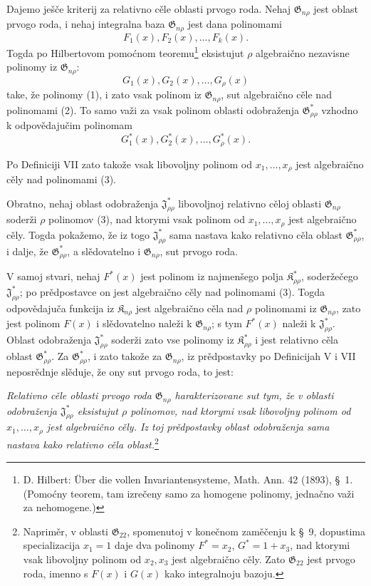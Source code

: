 \documentclass[11pt]{article}
\providecommand{\Kfield}{\mathfrak{K}}
\providecommand{\Jdom}{\mathfrak{J}}
\providecommand{\Gdom}{\mathfrak{G}}
\begin{document}
Dajemo ješče kriterij za relativno cěle oblasti prvogo roda. Nehaj $\Gdom_{n\rho}$ jest oblast prvogo roda, i nehaj integralna baza $\Gdom_{n\rho}$ jest dana polinomami
\begin{equation}
  F_1(x),F_2(x),\ldots,F_k(x).
\tag{1}
\end{equation}
Togda po Hilbertovom pomoćnom teoremu\footnote{D. Hilbert: Über die vollen Invariantensysteme, Math. Ann. 42 (1893), \S\ 1. (Pomoćny teorem, tam izrečeny samo za homogene polinomy, jednačno važi za nehomogene.)} eksistujut $\rho$ algebraično nezavisne polinomy iz $\Gdom_{n\rho}$:
\begin{equation}
  G_1(x),G_2(x),\ldots,G_\rho(x)
\tag{2}
\end{equation}
take, že polinomy (1), i zato vsak polinom iz $\Gdom_{n\rho}$, sut algebraično cěle nad polinomami (2). To samo važi za vsak polinom oblasti odobraženja $\Gdom^*_{\rho\rho}$ vzhodno k odpovědajučim polinomam
\begin{equation}
  G_1^*(x),G_2^*(x),\ldots,G_\rho^*(x).
\tag{3}
\end{equation}

Po Definiciji VII zato takože vsak libovoljny polinom od $x_1,\ldots,x_\rho$ jest algebraično cěly nad polinomami (3).

Obratno, nehaj oblast odobraženja $\Jdom^*_{\rho\rho}$ libovoljnoj relativno cěloj oblasti $\Gdom_{n\rho}$ soderži $\rho$ polinomov (3), nad ktorymi vsak polinom od $x_1,\ldots,x_\rho$ jest algebraično cěly. Togda pokažemo, že iz togo $\Jdom^*_{\rho\rho}$ sama nastava kako relativno cěla oblast $\Gdom^*_{\rho\rho}$, i dalje, že $\Gdom^*_{\rho\rho}$, a slědovatelno i $\Gdom_{n\rho}$, sut prvogo roda.

V samoj stvari, nehaj $F^*(x)$ jest polinom iz najmenšego polja $\Kfield^*_{\rho\rho}$, soderžečego $\Jdom^*_{\rho\rho}$; po prědpostavce on jest algebraično cěly nad polinomami (3). Togda odpovědajuča funkcija iz $\Kfield_{n\rho}$ jest algebraično cěla nad $\rho$ polinomami iz $\Gdom_{n\rho}$, zato jest polinom $F(x)$ i slědovatelno naleži k $\Gdom_{n\rho}$; s tym $F^*(x)$ naleži k $\Jdom^*_{\rho\rho}$. Oblast odobraženja $\Jdom^*_{\rho\rho}$ soderži zato vse polinomy iz $\Kfield^*_{\rho\rho}$ i jest relativno cěla oblast $\Gdom^*_{\rho\rho}$. Za $\Gdom^*_{\rho\rho}$, i zato takože za $\Gdom_{n\rho}$, iz prědpostavky po Definicijah V i VII neposrědnje slěduje, že ony sut prvogo roda, to jest:

{\itshape Relativno cěle oblasti prvogo roda $\Gdom_{n\rho}$ harakterizovane sut tym, že v oblasti odobraženja $\Jdom^*_{\rho\rho}$ eksistujut $\rho$ polinomov, nad ktorymi vsak libovoljny polinom od $x_1,\ldots,x_\rho$ jest algebraično cěly. Iz toj prědpostavky oblast odobraženja sama nastava kako relativno cěla oblast.}\footnote{Napriměr, v oblasti $\Gdom_{22}$, spomenutoj v konečnom zaměčenju k \S\ 9, dopustima specializacija $x_1=1$ daje dva polinomy $F^*=x_2$, $G^*=1+x_3$, nad ktorymi vsak libovoljny polinom od $x_2,x_3$ jest algebraično cěly. Zato $\Gdom_{22}$ jest prvogo roda, imenno s $F(x)$ i $G(x)$ kako integralnoju bazoju.}
\end{document}
